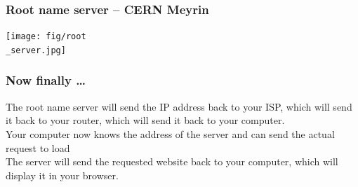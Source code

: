 \documentclass{beamer}
\begin{document}
\begin{frame}
  \frametitle{Root name server -- CERN Meyrin}
  \begin{center}
    \texttt{[image: fig/root\\\_server.jpg]}
  \end{center}
\end{frame}
\begin{frame}
  \frametitle{Now finally \dots}
  The root name server will send the IP address back to your ISP, which will send it back to your router, which will send it back to your computer.\\
  \vspace{5mm}
  Your computer now knows the address of the \texttt{} server and can send the actual request to load \texttt{}\\
  \vspace{5mm}
  The server will send the requested website back to your computer, which will display it in your browser.\\
\end{frame}
\end{document}
